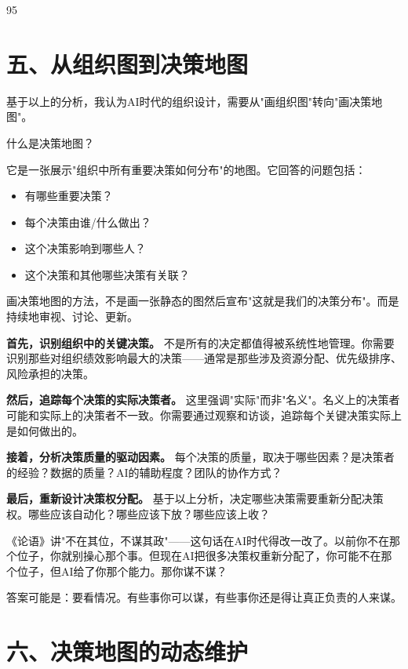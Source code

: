 95%

\section{五、从组织图到决策地图}


基于以上的分析，我认为AI时代的组织设计，需要从"画组织图"转向"画决策地图"。

什么是决策地图？

它是一张展示"组织中所有重要决策如何分布"的地图。它回答的问题包括：

\begin{itemize}
\item 有哪些重要决策？
\item 每个决策由谁/什么做出？
\item 这个决策影响到哪些人？
\item 这个决策和其他哪些决策有关联？

\end{itemize}
画决策地图的方法，不是画一张静态的图然后宣布"这就是我们的决策分布"。而是持续地审视、讨论、更新。

\textbf{首先，识别组织中的关键决策。} 不是所有的决定都值得被系统性地管理。你需要识别那些对组织绩效影响最大的决策——通常是那些涉及资源分配、优先级排序、风险承担的决策。

\textbf{然后，追踪每个决策的实际决策者。} 这里强调"实际"而非"名义"。名义上的决策者可能和实际上的决策者不一致。你需要通过观察和访谈，追踪每个关键决策实际上是如何做出的。

\textbf{接着，分析决策质量的驱动因素。} 每个决策的质量，取决于哪些因素？是决策者的经验？数据的质量？AI的辅助程度？团队的协作方式？

\textbf{最后，重新设计决策权分配。} 基于以上分析，决定哪些决策需要重新分配决策权。哪些应该自动化？哪些应该下放？哪些应该上收？

《论语》讲"不在其位，不谋其政"——这句话在AI时代得改一改了。以前你不在那个位子，你就别操心那个事。但现在AI把很多决策权重新分配了，你可能不在那个位子，但AI给了你那个能力。那你谋不谋？

答案可能是：要看情况。有些事你可以谋，有些事你还是得让真正负责的人来谋。

\section{六、决策地图的动态维护}


